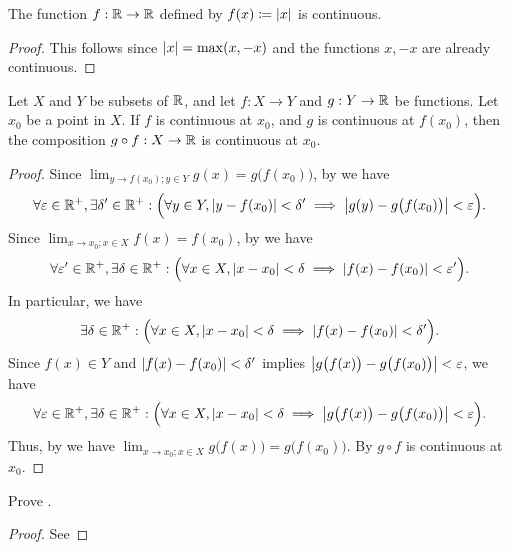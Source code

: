\begin{prop}\label{i:9.4.12}
  The function \(f : \mathbb{R} \to \mathbb{R}\) defined by \(f(x) \coloneqq \left\lvert x\right\rvert\) is continuous.
\end{prop}

\begin{proof}
  This follows since \(\left\lvert x\right\rvert = \max(x, -x)\) and the functions \(x, -x\) are already continuous.
\end{proof}

\begin{prop}\label{i:9.4.13}
  Let \(X\) and \(Y\) be subsets of \(\mathbb{R}\), and let \(f : X \to Y\) and \(g : Y \to \mathbb{R}\) be functions.
  Let \(x_0\) be a point in \(X\).
  If \(f\) is continuous at \(x_0\), and \(g\) is continuous at \(f(x_0)\), then the composition \(g \circ f : X \to \mathbb{R}\) is continuous at \(x_0\).
\end{prop}

\begin{proof}
  Since \(\lim_{y \to f(x_0) ; y \in Y} g(x) = g\big(f(x_0)\big)\), by  we have
  \[
    \forall \varepsilon \in \mathbb{R}^+, \exists \delta' \in \mathbb{R}^+ : \Big(\forall y \in Y, \left\lvert y - f(x_0)\right\rvert < \delta' \implies \left\lvert g(y) - g\big(f(x_0)\big)\right\rvert < \varepsilon\Big).
  \]
  Since \(\lim_{x \to x_0 ; x \in X} f(x) = f(x_0)\), by  we have
  \[
    \forall \varepsilon' \in \mathbb{R}^+, \exists \delta \in \mathbb{R}^+ : \Big(\forall x \in X, \left\lvert x - x_0\right\rvert < \delta \implies \left\lvert f(x) - f(x_0)\right\rvert < \varepsilon'\Big).
  \]
  In particular, we have
  \[
    \exists \delta \in \mathbb{R}^+ : \Big(\forall x \in X, \left\lvert x - x_0\right\rvert < \delta \implies \left\lvert f(x) - f(x_0)\right\rvert < \delta'\Big).
  \]
  Since \(f(x) \in Y\) and \(\left\lvert f(x) - f(x_0)\right\rvert < \delta'\) implies \(\left\lvert g\big(f(x)\big) - g\big(f(x_0)\big)\right\rvert < \varepsilon\), we have
  \[
    \forall \varepsilon \in \mathbb{R}^+, \exists \delta \in \mathbb{R}^+ : \Big(\forall x \in X, \left\lvert x - x_0\right\rvert < \delta \implies \left\lvert g\big(f(x)\big) - g\big(f(x_0)\big)\right\rvert < \varepsilon\Big).
  \]
  Thus, by  we have \(\lim_{x \to x_0 ; x \in X} g\big(f(x)\big) = g\big(f(x_0)\big)\).
  By  \(g \circ f\) is continuous at \(x_0\).
\end{proof}

\exercisesection

\begin{ex}\label{i:ex:9.4.1}
  Prove .
\end{ex}

\begin{proof}
  See 
\end{proof}

